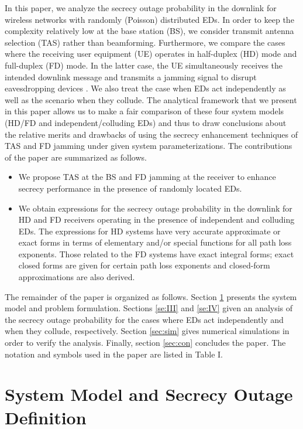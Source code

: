 \documentclass[10pt]{IEEEtran}
\begin{document}
In this paper, we analyze the secrecy outage probability in the downlink for wireless networks with randomly (Poisson) distributed EDs.  In order to keep the complexity relatively low at the base station (BS), we consider transmit antenna selection (TAS) rather than beamforming.  Furthermore, we compare the cases where the receiving user equipment (UE) operates in half-duplex (HD) mode and full-duplex (FD) mode.  In the latter case, the UE simultaneously receives the intended downlink message and transmits a jamming signal to disrupt eavesdropping devices \cite{G.C15}.  We also treat the case when EDs act independently as well as the scenario when they collude.  The analytical framework that we present in this paper allows us to make a fair comparison of these four system models (HD/FD and independent/colluding EDs) and thus to draw conclusions about the relative merits and drawbacks of using the secrecy enhancement techniques of TAS and FD jamming under given system parameterizations.  The contributions of the paper are summarized as follows.
\begin{itemize}
  \item We propose TAS at the BS and FD jamming at the receiver to enhance secrecy performance in the presence of randomly located EDs.
  \item We obtain expressions for the secrecy outage probability in the downlink for HD and FD receivers operating in the presence of independent and colluding EDs.  The expressions for HD systems have very accurate approximate or exact forms in terms of elementary and/or special functions for all path loss exponents.  Those related to the FD systems have exact integral forms; exact closed forms are given for certain path loss exponents and closed-form approximations are also derived.
\end{itemize}

The remainder of the paper is organized as follows.  Section \ref{se:II} presents the system model and problem formulation. Sections \ref{se:III} and \ref{se:IV} given an analysis of the secrecy outage probability for the cases where EDs act independently and when they collude, respectively. Section \ref{sec:sim} gives numerical simulations in order to verify the analysis.  Finally, section \ref{sec:con} concludes the paper. \noindent The notation and symbols used in the paper are listed in Table I.


\section{System Model and Secrecy Outage Definition} \label{se:II}
\end{document}
